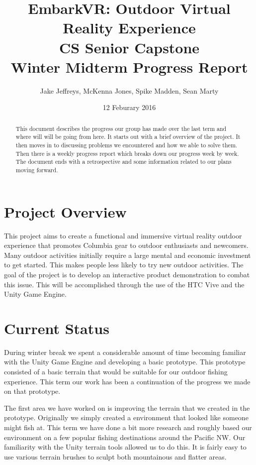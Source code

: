 \documentclass[10pt,journal,compsoc,onecolumn, draftclsnofoot]{IEEEtran}
\title{
EmbarkVR: Outdoor Virtual Reality Experience \\
CS Senior Capstone \\
Winter Midterm Progress Report\\
\vspace{1mm}
}
\author{Jake Jeffreys, McKenna Jones, Spike Madden, Sean Marty}
\date{12 Feburary 2016}
\begin{document}
\begin{titlepage}
\maketitle
\vspace{1mm}
\begin{abstract}
This document describes the progress our group has made over the last term and where will will be going from here. It starts out with a brief overview of the project. It then moves in to discussing problems we encountered and how we able to solve them. Then there is a weekly progress report which breaks down our progress week by week. The document ends with a retrospective and some information related to our plans moving forward.
\end{abstract}
\vspace{1cm}
\end{titlepage}
\tableofcontents
\clearpage

\section{Project Overview}
This project aims to create a functional and immersive virtual reality outdoor experience that promotes Columbia gear to outdoor enthusiasts and newcomers.
Many outdoor activities initially require a large mental and economic
investment to get started.
This makes people less likely to try new outdoor activities.
The goal of the project is to develop an interactive product demonstration to combat this issue.
This will be accomplished through the use of the HTC Vive and the Unity Game Engine.

\section{Current Status}
During winter break we spent a considerable amount of time becoming familiar with the Unity Game Engine and developing a basic prototype.
This prototype consisted of a basic terrain that would be suitable for our outdoor fishing experience.
This term our work has been a continuation of the progress we made on that prototype.

The first area we have worked on is improving the terrain that we created in the prototype.
Originally we simply created a environment that looked like someone might fish at.
This term we have done a bit more research and roughly based our environment on a few popular fishing destinations around the Pacific NW.
Our familiarity with the Unity terrain tools allowed us to do this.
It is fairly easy to use various terrain brushes to sculpt both mountainous and flatter areas.
\end{document}
